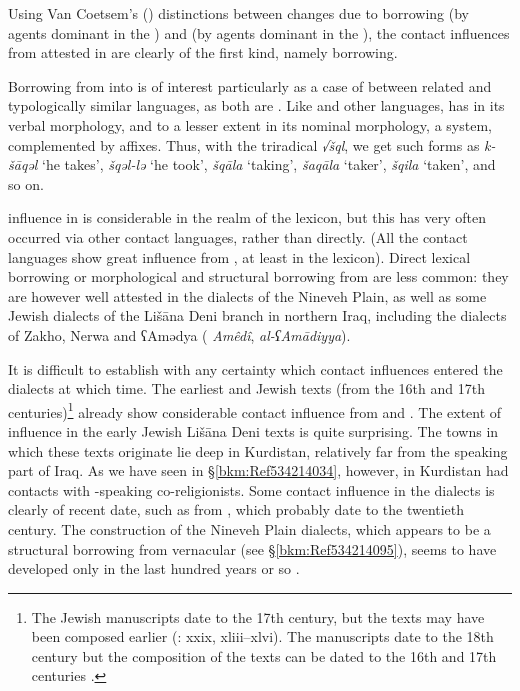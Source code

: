 \documentclass[output=paper]{langsci/langscibook}
\begin{document}
Using Van Coetsem’s (\citeyear{VanCoetsem1988,VanCoetsem2000}) distinctions between changes due to borrowing (by agents dominant in the ) and  (by agents dominant in the ), the contact influences from  attested in  are clearly of the first kind, namely borrowing.

Borrowing from  into  is of interest particularly as a case of  between related and typologically similar languages, as both are . Like  and other  languages,  has in its verbal morphology, and to a lesser extent in its nominal morphology, a   system, complemented by affixes. Thus, with the triradical  \textit{√šql}, we get such forms as \textit{k-šāqəl} ‘he takes’, \textit{šqəl-lə} ‘he took’, \textit{šqāla} ‘taking’, \textit{šaqāla} ‘taker’, \textit{šqila} ‘taken’, and so on.

 influence in  is considerable in the realm of the lexicon, but this has very often occurred via other contact languages, rather than directly. (All the contact languages show great influence from , at least in the lexicon). Direct lexical borrowing or morphological and structural borrowing from  are less common: they are however well attested in the  dialects of the Nineveh Plain, as well as some Jewish dialects of the Lišāna Deni branch in northern Iraq, including the dialects of Zakho, Nerwa and ʕAmədya ( \textit{Amêdî},  \textit{al\nobreakdash-ʕAmādiyya}).

It is difficult to establish with any certainty which contact influences entered the dialects at which time. The earliest  and Jewish  texts (from the 16th and 17th centuries)\footnote{The Jewish manuscripts date to the 17th century, but the texts may have been composed earlier (\citealt{Sabar1976}: xxix, xliii–xlvi). The  manuscripts date to the 18th century but the composition of the texts can be dated to the 16th and 17th centuries \citep[16]{Mengozzi2002}.} already show considerable contact influence from  and . The extent of  influence in the early Jewish Lišāna Deni texts \citep{Sabar1984} is quite surprising. The towns in which these texts originate lie deep in Kurdistan, relatively far from the  speaking part of Iraq. As we have seen in §\ref{bkm:Ref534214034}, however,  in Kurdistan had contacts with -speaking co{}-religionists. Some contact influence in the  dialects is clearly of recent date, such as  from , which probably date to the twentieth century. The  construction of the  Nineveh Plain dialects, which appears to be a structural borrowing from vernacular  (see §\ref{bkm:Ref534214095}), seems to have developed only in the last hundred years or so \citep[375]{Coghill2010}.
\end{document}

